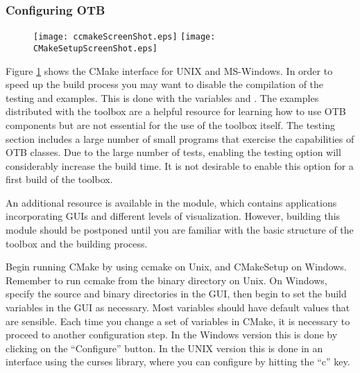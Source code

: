 \subsubsection{Configuring OTB}
\label{sec:ConfiguringOTBwithVTK}


\begin{figure}[ht]
\centering
\texttt{[image: ccmakeScreenShot.eps]}
\texttt{[image: CMakeSetupScreenShot.eps]}
\label{fig:CMakeGUI}
\end{figure}

Figure \ref{fig:CMakeGUI} shows the CMake interface for UNIX and MS-Windows.
In order to speed up the build process you may want to disable the compilation
of the testing and examples. This is done with the variables
 and .  The examples
distributed with the toolbox are a helpful resource for learning how to use OTB
components but are not essential for the use of the toolbox itself. The testing
section includes a large number of small programs that exercise the
capabilities of OTB classes. Due to the large number of tests, enabling the
testing option will considerably increase the build time.  It is not
desirable to enable this option for a first build of the toolbox.

An additional resource is available in the  module,
which contains applications incorporating GUIs and different levels
of visualization.  However, building this module
should be postponed until you are familiar with the basic structure of the
toolbox and the building process.

Begin running CMake by using
ccmake on Unix, and CMakeSetup on
Windows. Remember to run ccmake from the binary directory on Unix. On
Windows, specify the source and binary directories in the GUI, then begin to
set the build variables in the GUI as necessary.  Most variables should have
default values that are sensible. Each time you change a set of variables in
CMake, it is necessary to proceed to another configuration step. In the
Windows version this is done by clicking on the ``Configure'' button. In the
UNIX version this is done in an interface using the
curses library, where you can configure by hitting the ``c'' key.

